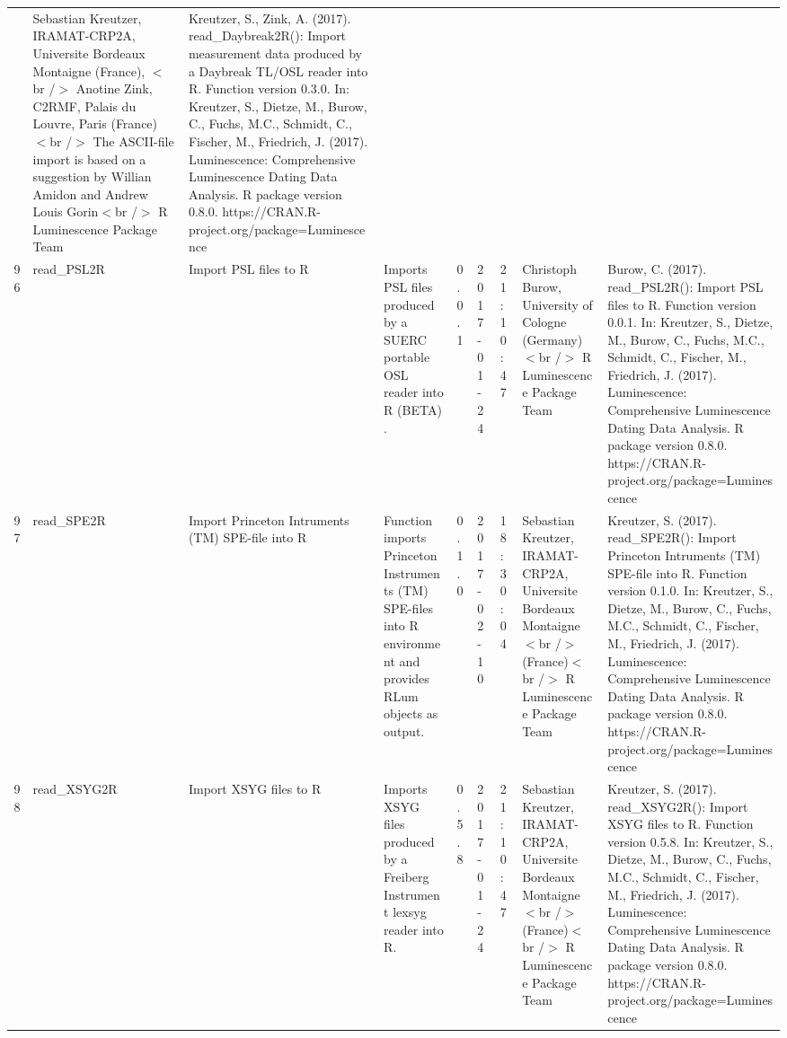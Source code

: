\begin{table}[ht]
\begin{tabular}{rllllllll}
 & Sebastian Kreutzer, IRAMAT-CRP2A, Universite Bordeaux Montaigne (France),  $<$br /$>$ Anotine Zink, C2RMF, Palais du Louvre, Paris (France) $<$br /$>$  The ASCII-file import is based on a suggestion by Willian Amidon and Andrew Louis Gorin$<$br /$>$  R Luminescence Package Team & Kreutzer, S., Zink, A. (2017). read\_Daybreak2R(): Import measurement data produced by a Daybreak TL/OSL reader into R. Function version 0.3.0. In: Kreutzer, S., Dietze, M., Burow, C., Fuchs, M.C., Schmidt, C., Fischer, M., Friedrich, J. (2017). Luminescence: Comprehensive Luminescence Dating Data Analysis. R package version 0.8.0. https://CRAN.R-project.org/package=Luminescence
 \\ 
  96 & read\_PSL2R & Import PSL files to R & Imports PSL files produced by a SUERC portable OSL reader into R  (BETA) . & 0.0.1 & 2017-01-24 & 21:10:47
 & Christoph Burow, University of Cologne (Germany)$<$br /$>$  R Luminescence Package Team & Burow, C. (2017). read\_PSL2R(): Import PSL files to R. Function version 0.0.1. In: Kreutzer, S., Dietze, M., Burow, C., Fuchs, M.C., Schmidt, C., Fischer, M., Friedrich, J. (2017). Luminescence: Comprehensive Luminescence Dating Data Analysis. R package version 0.8.0. https://CRAN.R-project.org/package=Luminescence
 \\ 
  97 & read\_SPE2R & Import Princeton Intruments (TM) SPE-file into R & Function imports Princeton Instruments (TM) SPE-files into R environment and provides  RLum  objects as output. & 0.1.0 & 2017-02-10 & 18:30:04
 & Sebastian Kreutzer, IRAMAT-CRP2A, Universite Bordeaux Montaigne$<$br /$>$ (France)$<$br /$>$  R Luminescence Package Team & Kreutzer, S. (2017). read\_SPE2R(): Import Princeton Intruments (TM) SPE-file into R. Function version 0.1.0. In: Kreutzer, S., Dietze, M., Burow, C., Fuchs, M.C., Schmidt, C., Fischer, M., Friedrich, J. (2017). Luminescence: Comprehensive Luminescence Dating Data Analysis. R package version 0.8.0. https://CRAN.R-project.org/package=Luminescence
 \\ 
  98 & read\_XSYG2R & Import XSYG files to R & Imports XSYG files produced by a Freiberg Instrument lexsyg reader into R. & 0.5.8 & 2017-01-24 & 21:10:47
 & Sebastian Kreutzer, IRAMAT-CRP2A, Universite Bordeaux Montaigne$<$br /$>$ (France)$<$br /$>$  R Luminescence Package Team & Kreutzer, S. (2017). read\_XSYG2R(): Import XSYG files to R. Function version 0.5.8. In: Kreutzer, S., Dietze, M., Burow, C., Fuchs, M.C., Schmidt, C., Fischer, M., Friedrich, J. (2017). Luminescence: Comprehensive Luminescence Dating Data Analysis. R package version 0.8.0. https://CRAN.R-project.org/package=Luminescence

\end{tabular}
\end{table}
